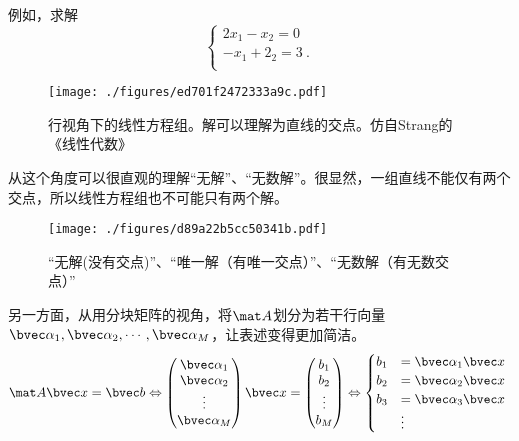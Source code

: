 \begin{example}{}
例如，求解
$$
\begin{cases}
2x_1-x_2=0 \\
-x_1+2_2=3~. \\
\end{cases}
$$
\begin{figure}[ht]
\centering
\texttt{[image: ./figures/ed701f2472333a9c.pdf]}
\caption{行视角下的线性方程组。解可以理解为直线的交点。仿自Strang的《线性代数》} \label{fig_LinEq_2}
\end{figure}
\end{example}
从这个角度可以很直观的理解“无解”、“无数解”。很显然，一组直线不能仅有两个交点，所以线性方程组也不可能只有两个解。
\begin{figure}[ht]
\centering
\texttt{[image: ./figures/d89a22b5cc50341b.pdf]}
\caption{“无解(没有交点)”、“唯一解（有唯一交点）”、“无数解（有无数交点）”} \label{fig_LinEq_3}
\end{figure}

另一方面，从用分块矩阵的视角，将$\mat A$划分为若干行向量$\bvec \alpha_1, \bvec \alpha_2, \cdots, \bvec \alpha_M$，让表述变得更加简洁。
$$
\mat A \bvec x=\bvec b \Leftrightarrow 
\begin{pmatrix}
\bvec \alpha_1 \\
\bvec \alpha_2 \\
\vdots \\
\bvec \alpha_M
\end{pmatrix}
\bvec x
=
\begin{pmatrix}
b_{1} \\
b_{2} \\
\vdots \\
b_{M}
\end{pmatrix}
\Leftrightarrow 
\begin{cases}
b_1&=\bvec \alpha_1 \bvec x \\
b_2&=\bvec \alpha_2 \bvec x \\
b_3&=\bvec \alpha_3 \bvec x \\
&\vdots
\end{cases}~
$$

